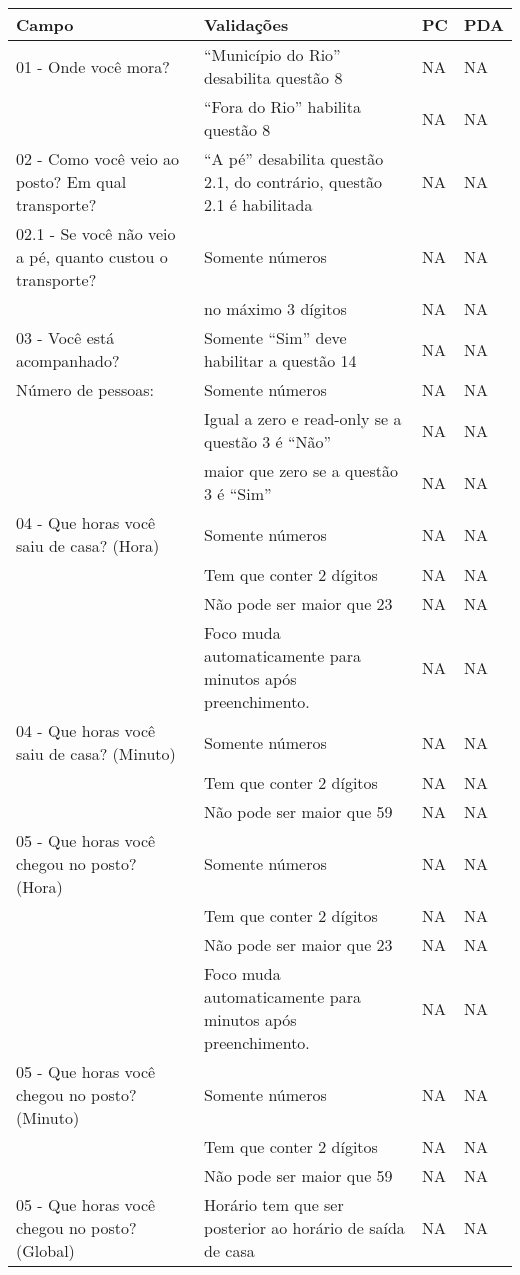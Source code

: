 \begin{longtable}{|p{}|p{}|p{}|p{}|}
\hline

Campo & Validações & PC & PDA \\ \hline

01 - Onde você mora? & ``Município do Rio'' desabilita questão 8 & NA & NA \\ \cline{2-4}  & ``Fora do Rio'' habilita questão 8  & NA  & NA \\ \hline

02 - Como você veio ao posto? Em qual transporte?  & ``A pé'' desabilita questão 2.1, do contrário, questão 2.1 é habilitada & NA & NA \\ \hline

02.1 - Se você não veio a pé, quanto custou o transporte? & Somente números & NA & NA \\ \cline{2-4} & no máximo 3 dígitos & NA & NA \\ \hline

03 - Você está acompanhado? & Somente ``Sim'' deve habilitar a questão 14 & NA & NA \\ \hline
Número de pessoas: & Somente números & NA & NA \\ \cline{2-4} & Igual a zero e read-only se a questão 3 é ``Não'' & NA & NA \\ \cline{2-4} & maior que zero se a questão 3 é ``Sim'' & NA & NA \\ \hline

04 - Que horas você saiu de casa? (Hora) & Somente números & NA & NA \\ \cline{2-4}  & Tem que conter 2 dígitos & NA & NA \\ \cline{2-4} & Não pode ser maior que 23 & NA & NA \\ \cline{2-4} & Foco muda automaticamente para minutos após preenchimento.  & NA & NA \\ \hline
04 - Que horas você saiu de casa? (Minuto) & Somente números & NA & NA \\ \cline{2-4}  & Tem que conter 2 dígitos & NA & NA \\ \cline{2-4} & Não pode ser maior que 59 & NA & NA \\ \hline

05 - Que horas você chegou no posto? (Hora) & Somente números & NA & NA \\ \cline{2-4}  & Tem que conter 2 dígitos & NA & NA \\ \cline{2-4} & Não pode ser maior que 23 & NA & NA \\ \cline{2-4} & Foco muda automaticamente para minutos após preenchimento.  & NA & NA \\ \hline
05 - Que horas você chegou no posto? (Minuto) & Somente números & NA & NA \\ \cline{2-4}  & Tem que conter 2 dígitos & NA & NA \\ \cline{2-4} & Não pode ser maior que 59 & NA & NA \\ \hline
05 - Que horas você chegou no posto? (Global) & Horário tem que ser posterior ao horário de saída de casa & NA & NA \\ \hline 


\end{longtable}
